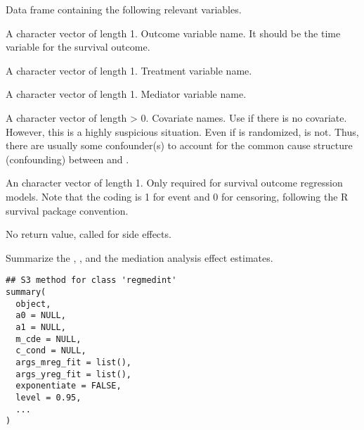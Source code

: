 \documentclass[a4paper]{book}
\begin{document}
%
\begin{Arguments}
\begin{ldescription}
\item[\code{data}] Data frame containing the following relevant variables.

\item[\code{yvar}] A character vector of length 1. Outcome variable name. It should be the time variable for the survival outcome.

\item[\code{avar}] A character vector of length 1. Treatment variable name.

\item[\code{mvar}] A character vector of length 1. Mediator variable name.

\item[\code{cvar}] A character vector of length > 0. Covariate names. Use  if there is no covariate. However, this is a highly suspicious situation. Even if  is randomized,  is not. Thus, there are usually some confounder(s) to account for the common cause structure (confounding) between  and .

\item[\code{eventvar}] An character vector of length 1. Only required for survival outcome regression models. Note that the coding is 1 for event and 0 for censoring, following the R survival package convention.
\end{ldescription}
\end{Arguments}
%
\begin{Value}
No return value, called for side effects.
\end{Value}
%
\begin{Description}
Summarize the , , and the mediation analysis effect estimates.
\end{Description}
%
\begin{Usage}
\begin{verbatim}
## S3 method for class 'regmedint'
summary(
  object,
  a0 = NULL,
  a1 = NULL,
  m_cde = NULL,
  c_cond = NULL,
  args_mreg_fit = list(),
  args_yreg_fit = list(),
  exponentiate = FALSE,
  level = 0.95,
  ...
)
\end{verbatim}
\end{Usage}
%
\end{document}
